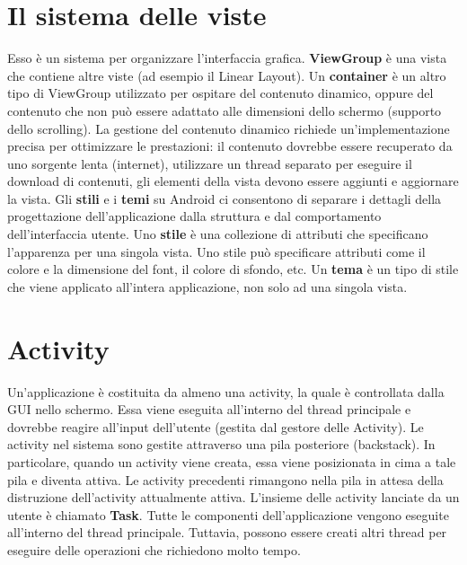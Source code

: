 \section{Il sistema delle viste}
Esso è un sistema per organizzare l'interfaccia grafica.
\textbf{ViewGroup} è una vista che contiene altre viste (ad esempio il Linear Layout).
Un \textbf{container} è un altro tipo di ViewGroup utilizzato per ospitare del contenuto dinamico, oppure del contenuto che non può essere adattato alle dimensioni dello schermo (supporto dello scrolling).
La gestione del contenuto dinamico richiede un'implementazione precisa per ottimizzare le prestazioni: il contenuto dovrebbe essere recuperato da uno sorgente lenta (internet), utilizzare un thread separato per eseguire il download di contenuti, gli elementi della vista devono essere aggiunti e aggiornare la vista.
Gli \textbf{stili} e i \textbf{temi} su Android ci consentono di separare i dettagli della progettazione dell'applicazione dalla struttura e dal comportamento dell'interfaccia utente.
Uno \textbf{stile} è una collezione di attributi che specificano l'apparenza per una singola vista.
Uno stile può specificare attributi come il colore e la dimensione del font, il colore di sfondo, etc.
Un \textbf{tema} è un tipo di stile che viene applicato all'intera applicazione, non solo ad una singola vista.

\section{Activity}
Un'applicazione è costituita da almeno una activity, la quale è controllata dalla GUI nello schermo.
Essa viene eseguita all'interno del thread principale e dovrebbe reagire all'input dell'utente (gestita dal gestore delle Activity).
Le activity nel sistema sono gestite attraverso una pila posteriore (backstack).
In particolare, quando un activity viene creata, essa viene posizionata in cima a tale pila e diventa attiva.
Le activity precedenti rimangono nella pila in attesa della distruzione dell'activity attualmente attiva.
L'insieme delle activity lanciate da un utente è chiamato \textbf{Task}.
Tutte le componenti dell'applicazione vengono eseguite all'interno del thread principale.
Tuttavia, possono essere creati altri thread per eseguire delle operazioni che richiedono molto tempo.

